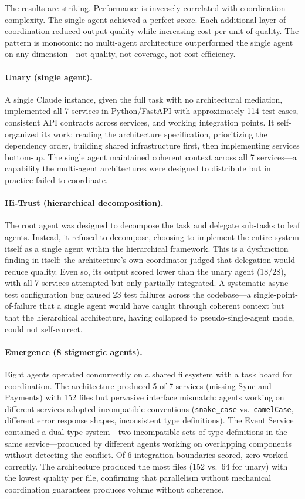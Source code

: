 \documentclass[11pt,a4paper]{article}
\begin{document}
The results are striking. Performance is inversely correlated with coordination complexity. The single agent achieved a perfect score. Each additional layer of coordination reduced output quality while increasing cost per unit of quality. The pattern is monotonic: no multi-agent architecture outperformed the single agent on any dimension---not quality, not coverage, not cost efficiency.

\paragraph{Unary (single agent).} A single Claude instance, given the full task with no architectural mediation, implemented all 7 services in Python/FastAPI with approximately 114 test cases, consistent API contracts across services, and working integration points. It self-organized its work: reading the architecture specification, prioritizing the dependency order, building shared infrastructure first, then implementing services bottom-up. The single agent maintained coherent context across all 7 services---a capability the multi-agent architectures were designed to distribute but in practice failed to coordinate.

\paragraph{Hi-Trust (hierarchical decomposition).} The root agent was designed to decompose the task and delegate sub-tasks to leaf agents. Instead, it refused to decompose, choosing to implement the entire system itself as a single agent within the hierarchical framework. This is a dysfunction finding in itself: the architecture's own coordinator judged that delegation would reduce quality. Even so, its output scored lower than the unary agent (18/28), with all 7 services attempted but only partially integrated. A systematic async test configuration bug caused 23 test failures across the codebase---a single-point-of-failure that a single agent would have caught through coherent context but that the hierarchical architecture, having collapsed to pseudo-single-agent mode, could not self-correct.

\paragraph{Emergence (8 stigmergic agents).} Eight agents operated concurrently on a shared filesystem with a task board for coordination. The architecture produced 5 of 7 services (missing Sync and Payments) with 152 files but pervasive interface mismatch: agents working on different services adopted incompatible conventions (\texttt{snake\_case} vs.\ \texttt{camelCase}, different error response shapes, inconsistent type definitions). The Event Service contained a dual type system---two incompatible sets of type definitions in the same service---produced by different agents working on overlapping components without detecting the conflict. Of 6 integration boundaries scored, zero worked correctly. The architecture produced the most files (152 vs.\ 64 for unary) with the lowest quality per file, confirming that parallelism without mechanical coordination guarantees produces volume without coherence.
\end{document}

